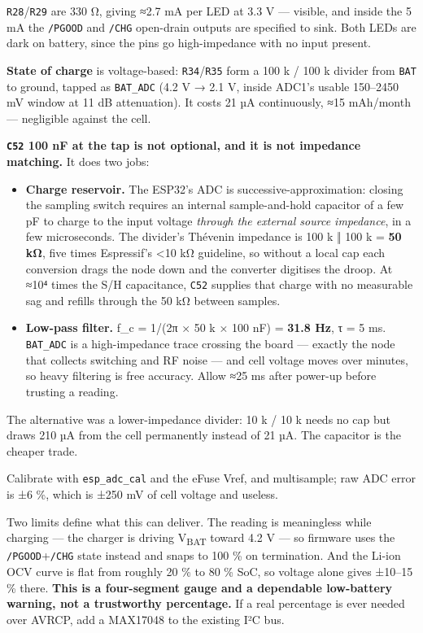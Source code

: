 \documentclass[11pt]{article}
\begin{document}
\texttt{R28}/\texttt{R29} are 330 Ω, giving ≈2.7 mA per LED at 3.3 V — visible, and inside the 5 mA
the \texttt{/PGOOD} and \texttt{/CHG} open-drain outputs are specified to sink. Both LEDs are dark on
battery, since the pins go high-impedance with no input present.

\textbf{State of charge} is voltage-based: \texttt{R34}/\texttt{R35} form a 100 k / 100 k divider
from \texttt{BAT} to ground, tapped as \texttt{BAT_ADC} (4.2 V → 2.1 V, inside ADC1's usable
150–2450 mV window at 11 dB attenuation). It costs 21 µA continuously, ≈15 mAh/month — negligible
against the cell.

\textbf{\texttt{C52} 100 nF at the tap is not optional, and it is not impedance matching.} It does
two jobs:

\begin{itemize}[leftmargin=1.4em]
\item \textbf{Charge reservoir.} The ESP32's ADC is successive-approximation: closing the sampling
  switch requires an internal sample-and-hold capacitor of a few pF to charge to the input voltage
  \textit{through the external source impedance}, in a few microseconds. The divider's Thévenin
  impedance is 100 k ‖ 100 k = \textbf{50 kΩ}, five times Espressif's <10 kΩ guideline, so without a
  local cap each conversion drags the node down and the converter digitises the droop. At ≈10⁴ times
  the S/H capacitance, \texttt{C52} supplies that charge with no measurable sag and refills through
  the 50 kΩ between samples.
\item \textbf{Low-pass filter.} f_c = 1/(2π × 50 k × 100 nF) = \textbf{31.8 Hz}, τ = 5 ms.
  \texttt{BAT_ADC} is a high-impedance trace crossing the board — exactly the node that collects
  switching and RF noise — and cell voltage moves over minutes, so heavy filtering is free accuracy.
  Allow ≈25 ms after power-up before trusting a reading.
\end{itemize}

The alternative was a lower-impedance divider: 10 k / 10 k needs no cap but draws 210 µA from the
cell permanently instead of 21 µA. The capacitor is the cheaper trade.

Calibrate with \texttt{esp_adc_cal} and the eFuse Vref, and multisample; raw ADC error is ±6 \%,
which is ±250 mV of cell voltage and useless.

Two limits define what this can deliver. The reading is meaningless while charging — the charger is
driving V\textsubscript{BAT} toward 4.2 V — so firmware uses the \texttt{/PGOOD}+\texttt{/CHG} state
instead and snaps to 100 \% on termination. And the Li-ion OCV curve is flat from roughly 20 \% to
80 \% SoC, so voltage alone gives ±10–15 \% there. \textbf{This is a four-segment gauge and a
dependable low-battery warning, not a trustworthy percentage.} If a real percentage is ever needed
over AVRCP, add a MAX17048 to the existing I²C bus.
\end{document}
